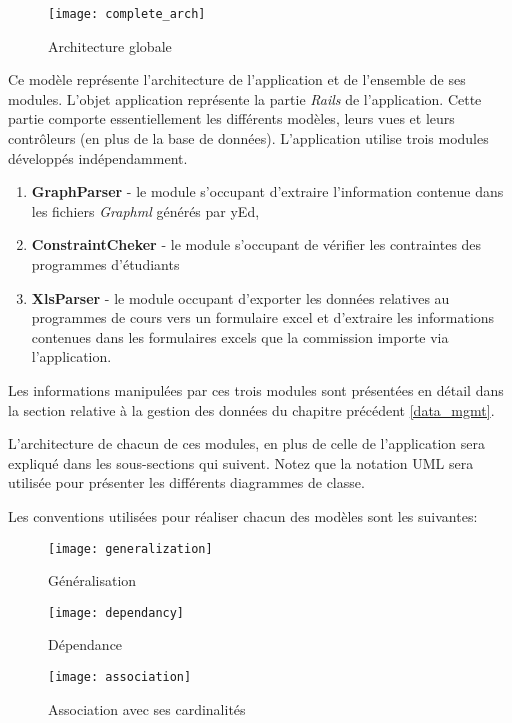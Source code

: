 \begin{figure}
\caption{Architecture globale}
\centering
\label{fig:complete_arch}
\texttt{[image: complete\_arch]}
\end{figure}

Ce modèle représente l'architecture de l'application et de l'ensemble de ses modules. L'objet application représente la partie \textit{Rails} de l'application. Cette partie comporte essentiellement les différents modèles, leurs vues et leurs contrôleurs (en plus de la base de données). L'application utilise trois modules développés indépendamment.
\begin{enumerate}
  \item \textbf{GraphParser} - le module s'occupant d'extraire l'information contenue dans les fichiers \textit{Graphml} générés par yEd, 
  \item \textbf{ConstraintCheker} - le module s'occupant de vérifier les contraintes des programmes d'étudiants
  \item \textbf{XlsParser} - le module occupant d'exporter les données relatives au programmes de cours vers un formulaire excel et d'extraire les informations contenues dans les formulaires excels que la commission importe via l'application. 
\end{enumerate}

Les informations manipulées par ces trois modules sont présentées en détail dans la section relative à la gestion des données du chapitre précédent \ref{data_mgmt}.

L'architecture de chacun de ces modules, en plus de celle de l'application sera expliqué dans les sous-sections qui suivent. Notez que la notation UML sera utilisée pour présenter les différents diagrammes de classe. 

Les conventions utilisées pour réaliser chacun des modèles sont les suivantes:


\begin{figure}[H]
\centering
\caption{Généralisation}
\label{fig:generalization}
\texttt{[image: generalization]}
\end{figure}

\begin{figure}[H]
\centering
\caption{Dépendance}
\label{fig:dependancy}
\texttt{[image: dependancy]}
\end{figure}


\begin{figure}[H]
\centering
\caption{Association avec ses cardinalités}
 \label{fig:association}
\texttt{[image: association]}
\end{figure}

